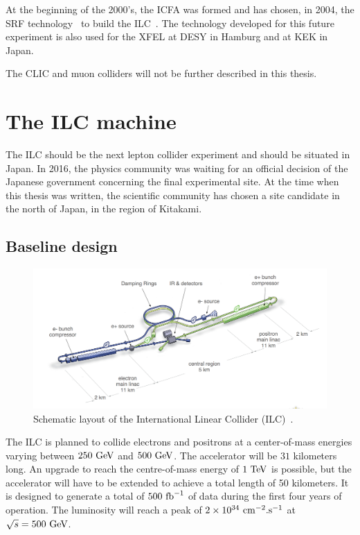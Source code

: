     At the beginning of the 2000's, the \gls{ICFA} was formed and has chosen, in 2004, the \gls{SRF} technology~\cite{ICFA2004} to build the \gls{ILC}~\cite{ILC}.
    The technology developed for this future experiment is also used for the XFEL at \gls{DESY} in Hamburg and at KEK in Japan.
        
    The \gls{CLIC} and muon colliders will not be further described in this thesis.
     
  \section{The ILC machine}
  
    The \gls{ILC} should be the next lepton collider experiment and should be situated in Japan.
    In 2016, the physics community was waiting for an official decision of the Japanese government concerning the final experimental site.
    At the time when this thesis was written, the scientific community has chosen a site candidate in the north of Japan, in the region of Kitakami. 
    
    \subsection{Baseline design}

   \begin{figure}[!h]
      \centering
      \includegraphics[width = 16 cm]{Pictures/ILC/ILC_new.png}
      \caption{Schematic layout of the International Linear Collider (ILC)~\cite{Behnke2013}.}
      \label{fig:ILC}
    \end{figure}


    The \gls{ILC} is planned to collide electrons and positrons at a center-of-mass energies varying between $250~\rm{GeV}$ and $500~\rm{GeV}$.
    The accelerator will be $31$ kilometers long.
    An upgrade to reach the centre-of-mass energy of $1~\rm{TeV}$ is possible, but the accelerator will have to be extended to achieve a total length of 50 kilometers.
    It is designed to generate a total of $500~\rm{fb}^{-1}$ of data during the first four years of operation. 
    The luminosity will reach a peak of $2 \times 10^{34}~\rm{cm}^{-2}\rm{.s}^{-1}$ at $\sqrt s = 500~\rm{GeV}$.

